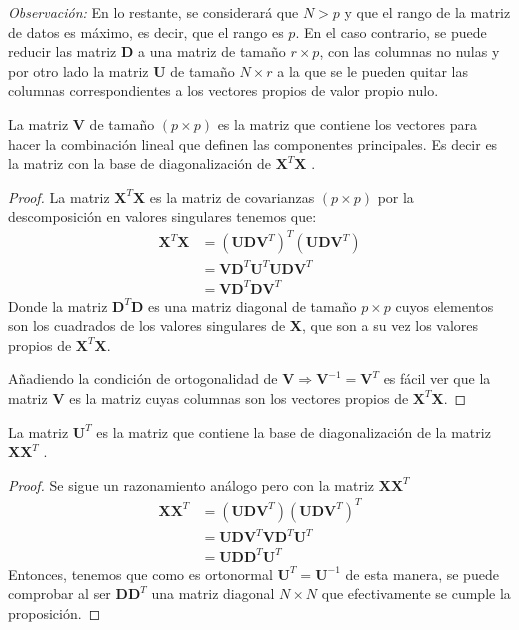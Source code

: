 \noindent \emph{Observación: }En lo restante, se considerará que $N>p$ y que el rango de la matriz de datos es máximo, es decir, que el rango es $p$. En el caso contrario, se puede reducir las matriz $\mathbf{D}$ a una matriz de tamaño $r\times p$, con las columnas no nulas y por otro lado la matriz $\mathbf{U}$ de tamaño $N\times r$ a la que se le pueden quitar las columnas correspondientes a los vectores propios de valor propio nulo. 

\noindent 
\begin{propo}
La matriz $\mathbf{V}$ de tamaño $(p\times p)$ es la matriz que contiene los vectores para hacer la combinación lineal que definen las componentes principales. Es decir es la matriz con la base de diagonalización de $\mathbf{X}^T\mathbf{X}$ \cite{Johnson 1963}.
\begin{proof}
La matriz $\textbf{X}^T \textbf{X}$ es la matriz de covarianzas $(p \times p)$  por la descomposición en valores singulares tenemos que:
\begin{align*}
\textbf{X}^T \textbf{X} &= (\textbf{U}\mathbf{D} \textbf{V}^T)^T (\textbf{U}\mathbf{D} \textbf{V}^T)\\
&= \textbf{V}\mathbf{D} ^T \textbf{U}^T \textbf{U}\mathbf{D} \textbf{V}^T\\
&= \textbf{V}\mathbf{D} ^T \mathbf{D} \textbf{V}^T
\end{align*}
Donde la matriz $\mathbf{D} ^T \mathbf{D} $ es una matriz diagonal de tamaño $p \times p $ cuyos elementos son los cuadrados de los valores singulares de \textbf{X}, que son a su vez los valores propios de $\textbf{X}^T \textbf{X}$. 

\noindent Añadiendo la condición de ortogonalidad de $\textbf{V}\Rightarrow \textbf{V}^{-1}=\mathbf{V}^T$ es fácil ver que la matriz \textbf{V} es la matriz cuyas columnas son los vectores propios de $\textbf{X}^T\textbf{X}$.
\end{proof}
\end{propo}

\begin{propo}
La matriz $\mathbf{U}^T$ es la matriz que contiene la base de diagonalización de la matriz $\mathbf{XX}^T$ \cite{Johnson 1963}.  
\begin{proof}
Se sigue un razonamiento análogo pero con la matriz $\mathbf{XX}^T$
\begin{align*}
\textbf{X} \textbf{X}^T  &= (\textbf{U}\mathbf{D} \textbf{V}^T)(\textbf{U}\mathbf{D} \textbf{V}^T)^T\\
&= \mathbf{UDV}^T\mathbf{VD}^T\mathbf{U}^T\\
&= \mathbf{UDD}^T\mathbf{U}^T
\end{align*}
Entonces, tenemos que como es ortonormal $\mathbf{U}^T=\mathbf{U}^{-1}$ de esta manera, se puede comprobar al ser $\mathbf{DD}^T$ una matriz diagonal $N\times N$ que efectivamente se cumple la proposición.\qedhere
\end{proof}
\end{propo}

